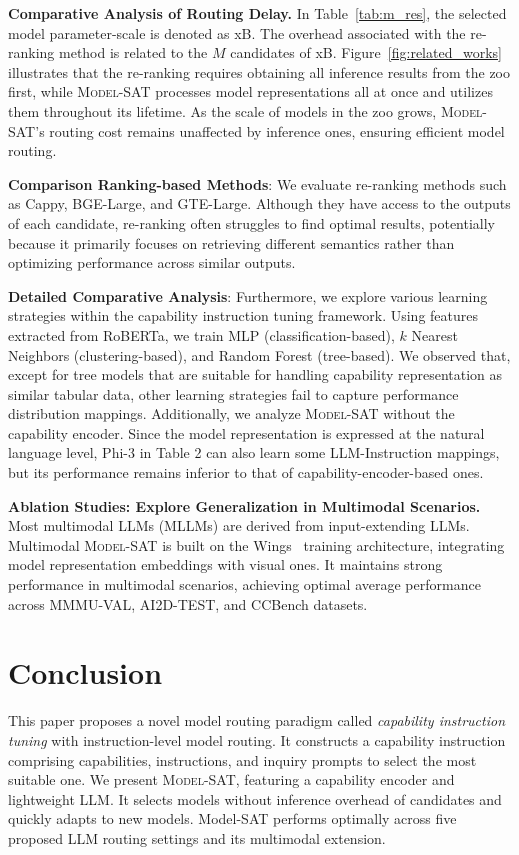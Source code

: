 \textbf{Comparative Analysis of Routing Delay.} In Table~\ref{tab:m_res}, the selected model parameter-scale is denoted as xB. The overhead associated with the re-ranking method is related to the $M$ candidates of xB. Figure~\ref{fig:related_works} illustrates that the re-ranking requires obtaining all inference results from the zoo first, while \textsc{Model-SAT} processes model representations all at once and utilizes them throughout its lifetime. As the scale of models in the zoo grows, \textsc{Model-SAT}'s routing cost remains unaffected by inference ones, ensuring efficient model routing.

\textbf{Comparison Ranking-based Methods}: We evaluate re-ranking methods such as Cappy, BGE-Large, and GTE-Large. Although they have access to the outputs of each candidate, re-ranking often struggles to find optimal results, potentially because it primarily focuses on retrieving different semantics rather than optimizing performance across similar outputs.

\textbf{Detailed Comparative Analysis}: Furthermore, we explore various learning strategies within the capability instruction tuning framework. Using features extracted from RoBERTa, we train MLP (classification-based), $k$ Nearest Neighbors (clustering-based), and Random Forest (tree-based). We observed that, except for tree models that are suitable for handling capability representation as similar tabular data, other learning strategies fail to capture performance distribution mappings. Additionally, we analyze \textsc{Model-SAT} without the capability encoder. Since the model representation is expressed at the natural language level, Phi-3 in Table 2 can also learn some LLM-Instruction mappings, but its performance remains inferior to that of capability-encoder-based ones.

\textbf{Ablation Studies: Explore Generalization in Multimodal Scenarios.} Most multimodal LLMs (MLLMs) are derived from input-extending LLMs. Multimodal \textsc{Model-SAT} is built on the Wings~\cite{zhang2024wingslearningmultimodalllms} training architecture, integrating model representation embeddings with visual ones. It maintains strong performance in multimodal scenarios, achieving optimal average performance across MMMU-VAL, AI2D-TEST, and CCBench datasets.

\section{Conclusion}

This paper proposes a novel model routing paradigm called \textit{capability instruction tuning} with instruction-level model routing. It constructs a capability instruction comprising capabilities, instructions, and inquiry prompts to select the most suitable one. We present \textsc{Model-SAT}, featuring a capability encoder and lightweight LLM. It selects models without inference overhead of candidates and quickly adapts to new models. Model-SAT performs optimally across five proposed LLM routing settings and its multimodal extension.
